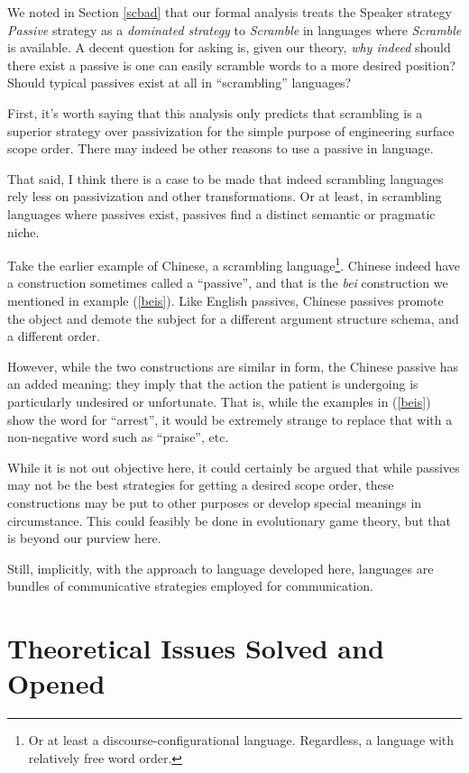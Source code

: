 \documentclass{article}
\begin{document}
We noted in Section \ref{scbad} that our formal analysis treats the Speaker strategy \textit{Passive} strategy as a \emph{dominated strategy} to \textit{Scramble} in languages where \textit{Scramble} is available.
A decent question for asking is, given our theory, \emph{why indeed} should there exist a passive is one can easily scramble words to a more desired position? Should typical passives exist at all in ``scrambling'' languages?

First, it's worth saying that this analysis only predicts that scrambling is a superior strategy over passivization for the simple purpose of engineering surface scope order.
There may indeed be other reasons to use a passive in language.

That said, I think there is a case to be made that indeed scrambling languages rely less on passivization and other transformations.
Or at least, in scrambling languages where passives exist, passives find a distinct semantic or pragmatic niche.

Take the earlier example of Chinese, a scrambling language\footnote{Or at least a discourse-configurational language. Regardless, a language with relatively free word order.}.
Chinese indeed have a construction sometimes called a ``passive'', and that is the \textit{bei} construction we mentioned in example (\ref{beis}).
Like English passives, Chinese passives promote the object and demote the subject for a different argument structure schema, and a different order.

However, while the two constructions are similar in form, the Chinese passive has an added meaning: they imply that the action the patient is undergoing is particularly undesired or unfortunate.
That is, while the examples in (\ref{beis}) show the word for ``arrest'', it would be extremely strange to replace that with a non-negative word such as ``praise'', etc.

While it is not out objective here, it could certainly be argued that while passives may not be the best strategies for getting a desired scope order, these constructions may be put to other purposes or develop special meanings in circumstance.
This could feasibly be done in evolutionary game theory, but that is beyond our purview here.

Still, implicitly, with the approach to language developed here, languages are bundles of communicative strategies employed for communication.


\section{Theoretical Issues Solved and Opened}
\end{document}
